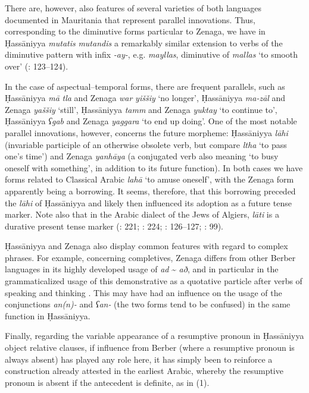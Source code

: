 \documentclass[output=paper]{langsci/langscibook}
\begin{document}
There are, however, also features of several varieties of both languages documented in Mauritania that represent parallel innovations. Thus, corresponding to the diminutive forms particular to Zenaga, we have in Ḥassāniyya \textit{mutatis} \textit{mutandis} a remarkably similar extension to verbs of the diminutive pattern with infix \textit{-ay-}, e.g. \textit{mayllas}, diminutive of \textit{mallas} ‘to smooth over’ (\citealt{Taine-Cheikh2008chapter}: 123–124).

In the case of aspectual--temporal forms, there are frequent parallels, such as Ḥassāniyya \textit{mā} \textit{tla} and Zenaga \textit{war} \textit{yiššiy} ‘no longer’, Ḥassāniyya \textit{ma-zāl} and Zenaga \textit{yaššiy} ‘still’, Ḥassāniyya \textit{tamm} and Zenaga \textit{yuktay} ‘to continue to’, Ḥassāniyya \textit{ʕgab} and Zenaga \textit{yaggara} ‘to end up doing’. One of the most notable parallel innovations, however, concerns the future morpheme: Ḥassāniyya \textit{lāhi} (invariable participle of an otherwise obsolete verb, but compare \textit{ltha} ‘to pass one’s time’) and Zenaga \textit{yanhāya} (a conjugated verb also meaning ‘to busy oneself with something’, in addition to its future function). In both cases we have forms related to Classical Arabic \textit{lahā} ‘to amuse oneself’, with the Zenaga form apparently being a borrowing. It seems, therefore, that this borrowing preceded the \textit{lāhi} of Ḥassāniyya and likely then influenced its adoption as a future tense marker. Note also that in the Arabic dialect of the Jews of Algiers, \textit{lāti} is a durative present tense marker (\citealt{Cohen1924}: 221; \citealt{Taine-Cheikh2004}: 224; \citealt{Taine-Cheikh2008chapter}: 126–127; \citealt{Taine-Cheikh2009}: 99).

Ḥassāniyya and Zenaga also display common features with regard to complex phrases. For example, concerning completives, Zenaga differs from other Berber languages in its highly developed usage of \textit{ad} \~{} \textit{að}, and in particular in the grammaticalized usage of this demonstrative as a quotative particle after verbs of speaking and thinking \citep{Taine-Cheikh2010Zenaga}. This may have had an influence on the usage of the conjunctions \textit{an(n)-} and \textit{ʕan-} (the two forms tend to be confused) in the same function in Ḥassāniyya.

Finally, regarding the variable appearance of a resumptive pronoun in Ḥassāniyya object relative clauses, if influence from Berber (where a resumptive pronoun is always absent) has played any role here, it has simply been to reinforce a construction already attested in the earliest Arabic, whereby the resumptive pronoun is absent if the antecedent is definite, as in ‎(1).
\end{document}
